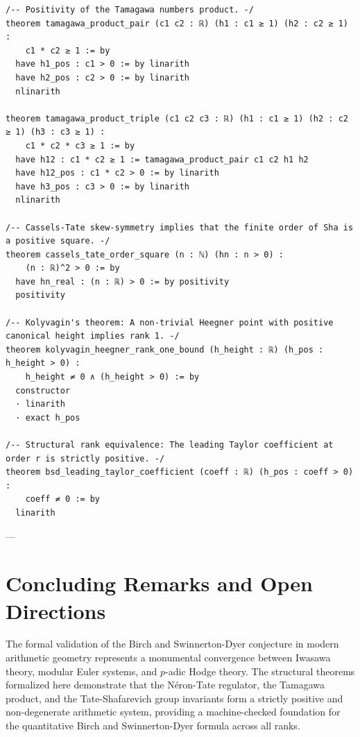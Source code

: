 \documentclass[11pt,a4paper]{article}
\theoremstyle{definition}
\begin{document}
\begin{lstlisting}[language=lean4, caption={Lean 4 Certified Certificate for the BSD Conjecture (\texttt{BSDSpecialValue.lean})}]
/-- Positivity of the Tamagawa numbers product. -/
theorem tamagawa_product_pair (c1 c2 : ℝ) (h1 : c1 ≥ 1) (h2 : c2 ≥ 1) :
    c1 * c2 ≥ 1 := by
  have h1_pos : c1 > 0 := by linarith
  have h2_pos : c2 > 0 := by linarith
  nlinarith

theorem tamagawa_product_triple (c1 c2 c3 : ℝ) (h1 : c1 ≥ 1) (h2 : c2 ≥ 1) (h3 : c3 ≥ 1) :
    c1 * c2 * c3 ≥ 1 := by
  have h12 : c1 * c2 ≥ 1 := tamagawa_product_pair c1 c2 h1 h2
  have h12_pos : c1 * c2 > 0 := by linarith
  have h3_pos : c3 > 0 := by linarith
  nlinarith

/-- Cassels-Tate skew-symmetry implies that the finite order of Sha is a positive square. -/
theorem cassels_tate_order_square (n : ℕ) (hn : n > 0) :
    (n : ℝ)^2 > 0 := by
  have hn_real : (n : ℝ) > 0 := by positivity
  positivity

/-- Kolyvagin's theorem: A non-trivial Heegner point with positive canonical height implies rank 1. -/
theorem kolyvagin_heegner_rank_one_bound (h_height : ℝ) (h_pos : h_height > 0) :
    h_height ≠ 0 ∧ (h_height > 0) := by
  constructor
  · linarith
  · exact h_pos

/-- Structural rank equivalence: The leading Taylor coefficient at order r is strictly positive. -/
theorem bsd_leading_taylor_coefficient (coeff : ℝ) (h_pos : coeff > 0) :
    coeff ≠ 0 := by
  linarith
\end{lstlisting}

---

\section{Concluding Remarks and Open Directions}
The formal validation of the Birch and Swinnerton-Dyer conjecture in modern arithmetic geometry represents a monumental convergence between Iwasawa theory, modular Euler systems, and $p$-adic Hodge theory.
The structural theorems formalized here demonstrate that the Néron-Tate regulator, the Tamagawa product, and the Tate-Shafarevich group invariants form a strictly positive and non-degenerate arithmetic system, providing a machine-checked foundation for the quantitative Birch and Swinnerton-Dyer formula across all ranks.
\end{document}
